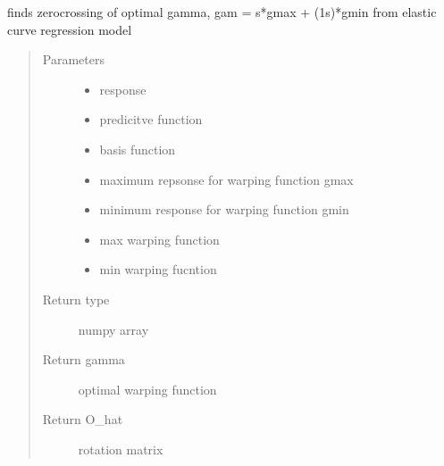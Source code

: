 \documentclass[letterpaper,10pt,english]{sphinxmanual}
\begin{document}
\begin{fulllineitems}
\label{\detokenize{curve_functions:curve_functions.curve_zero_crossing}}
finds zero\sphinxhyphen{}crossing of optimal gamma, gam = s*gmax + (1\sphinxhyphen{}s)*gmin
from elastic curve regression model
\begin{quote}\begin{description}
\item[{Parameters}] \leavevmode\begin{itemize}
\item {} 
 \textendash{} response

\item {} 
 \textendash{} predicitve function

\item {} 
 \textendash{} basis function

\item {} 
 \textendash{} maximum repsonse for warping function gmax

\item {} 
 \textendash{} minimum response for warping function gmin

\item {} 
 \textendash{} max warping function

\item {} 
 \textendash{} min warping fucntion

\end{itemize}

\item[{Return type}] \leavevmode
numpy array

\item[{Return gamma}] \leavevmode
optimal warping function

\item[{Return O\_hat}] \leavevmode
rotation matrix

\end{description}\end{quote}

\end{fulllineitems}
\end{document}
